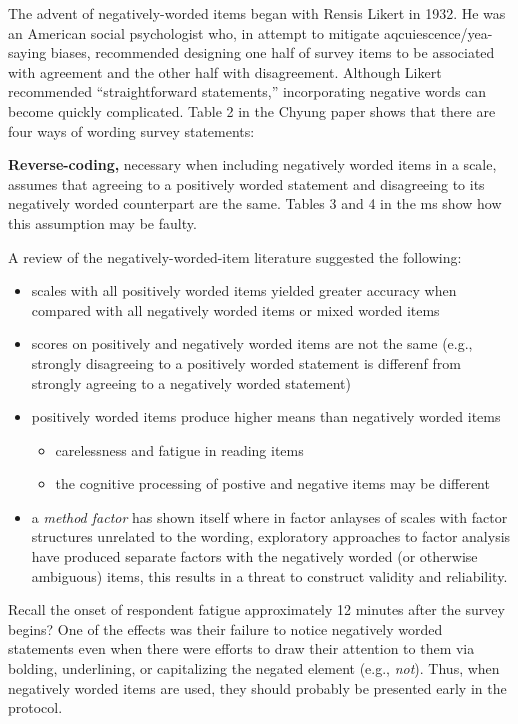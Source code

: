 \documentclass[
  english,
]{book}
\providecommand{\tightlist}{%
  \setlength{\itemsep}{0pt}\setlength{\parskip}{0pt}}
\begin{document}
The advent of negatively-worded items began with Rensis Likert in 1932. He was an American social psychologist who, in attempt to mitigate aqcuiescence/yea-saying biases, recommended designing one half of survey items to be associated with agreement and the other half with disagreement. Although Likert recommended ``straightforward statements,'' incorporating negative words can become quickly complicated. Table 2 in the Chyung paper shows that there are four ways of wording survey statements:

\textbf{Reverse-coding,} necessary when including negatively worded items in a scale, assumes that agreeing to a positively worded statement and disagreeing to its negatively worded counterpart are the same. Tables 3 and 4 in the ms show how this assumption may be faulty.

A review of the negatively-worded-item literature suggested the following:

\begin{itemize}
\tightlist
\item
  scales with all positively worded items yielded greater accuracy when compared with all negatively worded items or mixed worded items
\item
  scores on positively and negatively worded items are not the same (e.g., strongly disagreeing to a positively worded statement is differenf from strongly agreeing to a negatively worded statement)
\item
  positively worded items produce higher means than negatively worded items

  \begin{itemize}
  \tightlist
  \item
    carelessness and fatigue in reading items
  \item
    the cognitive processing of postive and negative items may be different
  \end{itemize}
\item
  a \emph{method factor} has shown itself where in factor anlayses of scales with factor structures unrelated to the wording, exploratory approaches to factor analysis have produced separate factors with the negatively worded (or otherwise ambiguous) items, this results in a threat to construct validity and reliability.
\end{itemize}

Recall the onset of respondent fatigue approximately 12 minutes after the survey begins? One of the effects was their failure to notice negatively worded statements even when there were efforts to draw their attention to them via bolding,
underlining, or capitalizing the negated element (e.g., \emph{not}). Thus, when negatively worded items are used, they should probably be presented early in the protocol.
\end{document}
